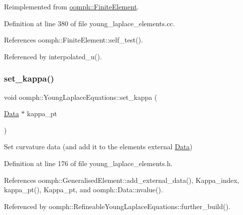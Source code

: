 Reimplemented from \hyperlink{classoomph_1_1FiniteElement_af94c5a5e22175d5420b33b3b79e46ed3}{oomph\+::\+Finite\+Element}.



Definition at line 380 of file young\+\_\+laplace\+\_\+elements.\+cc.



References oomph\+::\+Finite\+Element\+::self\+\_\+test().



Referenced by interpolated\+\_\+u().

\mbox{\label{classoomph_1_1YoungLaplaceEquations_a2f1e916b64e50292e47827ea7ba41db5}} 
\subsubsection{\texorpdfstring{set\+\_\+kappa()}{set\_kappa()}}
{\footnotesize\ttfamily void oomph\+::\+Young\+Laplace\+Equations\+::set\+\_\+kappa (\begin{DoxyParamCaption}\item[{\hyperlink{classoomph_1_1Data}{Data} $\ast$}]{kappa\+\_\+pt }\end{DoxyParamCaption})\hspace{0.3cm}{\ttfamily [inline]}}



Set curvature data (and add it to the element\textquotesingle{}s external \hyperlink{classoomph_1_1Data}{Data}) 



Definition at line 176 of file young\+\_\+laplace\+\_\+elements.\+h.



References oomph\+::\+Generalised\+Element\+::add\+\_\+external\+\_\+data(), Kappa\+\_\+index, kappa\+\_\+pt(), Kappa\+\_\+pt, and oomph\+::\+Data\+::nvalue().



Referenced by oomph\+::\+Refineable\+Young\+Laplace\+Equations\+::further\+\_\+build().

\mbox{\label{classoomph_1_1YoungLaplaceEquations_a123ecf6aeb497b78e6db88995aa22472}} 
